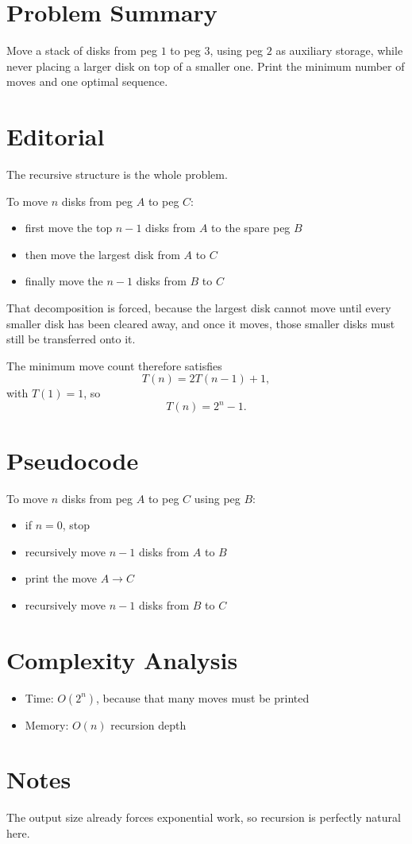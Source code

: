 \section{Problem Summary}
Move a stack of disks from peg \(1\) to peg \(3\), using peg \(2\) as auxiliary storage, while never placing a larger disk on top of a smaller one. Print the minimum number of moves and one optimal sequence.

\section{Editorial}
The recursive structure is the whole problem.

To move \(n\) disks from peg \(A\) to peg \(C\):
\begin{itemize}
\item first move the top \(n - 1\) disks from \(A\) to the spare peg \(B\)
\item then move the largest disk from \(A\) to \(C\)
\item finally move the \(n - 1\) disks from \(B\) to \(C\)
\end{itemize}

That decomposition is forced, because the largest disk cannot move until every smaller disk has been cleared away, and once it moves, those smaller disks must still be transferred onto it.

The minimum move count therefore satisfies
\[
T(n) = 2T(n - 1) + 1,
\]
with \(T(1) = 1\), so
\[
T(n) = 2^n - 1.
\]

\section{Pseudocode}
To move \(n\) disks from peg \(A\) to peg \(C\) using peg \(B\):

\begin{itemize}
\item if \(n = 0\), stop
\item recursively move \(n - 1\) disks from \(A\) to \(B\)
\item print the move \(A \to C\)
\item recursively move \(n - 1\) disks from \(B\) to \(C\)
\end{itemize}

\section{Complexity Analysis}
\begin{itemize}
\item Time: \(O(2^n)\), because that many moves must be printed
\item Memory: \(O(n)\) recursion depth
\end{itemize}

\section{Notes}
The output size already forces exponential work, so recursion is perfectly natural here.

